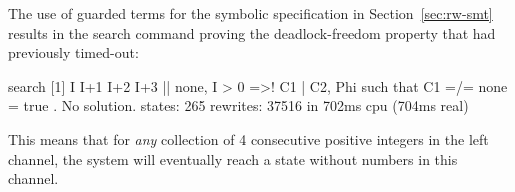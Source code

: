 The use of guarded terms for the symbolic specification 
in Section~\ref{sec:rw-smt} results in the search command
proving the deadlock-freedom property that had previously timed-out:

\begin{maude}
search [1]  { I  I+1 I+2 I+3 || none, I > 0 } 
       =>!  { C1 | C2, Phi } such that C1 =/= none = true .
No solution.
states: 265  rewrites: 37516 in 702ms cpu (704ms real) 
\end{maude}

\noindent This means that for \emph{any} collection of 4 consecutive
positive integers in the left channel, the system will eventually
reach a state without numbers in this channel.
